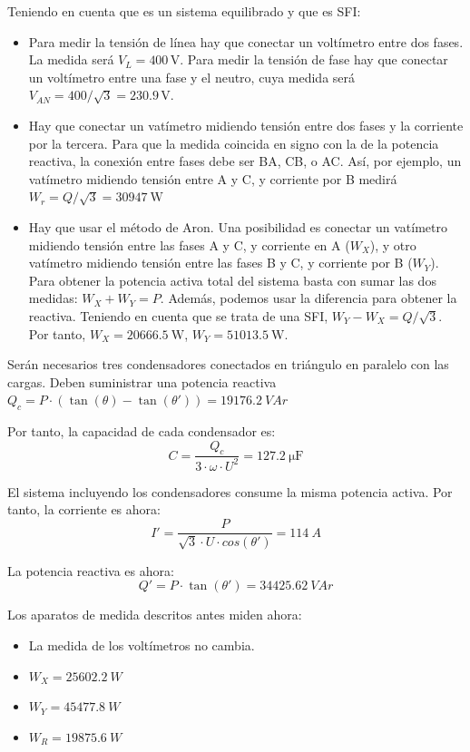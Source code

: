 Teniendo en cuenta que es un sistema equilibrado y que es SFI:
\begin{itemize}

\item Para medir la tensión de línea hay que conectar un voltímetro
  entre dos fases. La medida será $V_{L} = 400\,\mathrm{V}$. Para medir
  la tensión de fase hay que conectar un voltímetro entre una fase y
  el neutro, cuya medida será $V_{AN} = 400 / \sqrt{3} = 230.9\,\mathrm{V}$.

\item Hay que conectar un vatímetro midiendo tensión entre dos fases y
  la corriente por la tercera. Para que la medida coincida en signo
  con la de la potencia reactiva, la conexión entre fases debe ser BA,
  CB, o AC. Así, por ejemplo, un vatímetro midiendo tensión entre A y
  C, y corriente por B medirá $W_r = Q / \sqrt{3} = \qty{30947}{\watt}$

\item Hay que usar el método de Aron. Una posibilidad es conectar un
  vatímetro midiendo tensión entre las fases A y C, y corriente en A
  ($W_X$), y otro vatímetro midiendo tensión entre las fases B y C, y
  corriente por B ($W_Y$). Para obtener la potencia activa total del
  sistema basta con sumar las dos medidas: $W_{X} + W_{Y} =
  P$. Además, podemos usar la diferencia para obtener la
  reactiva. Teniendo en cuenta que se trata de una SFI,
  $W_Y - W_X = Q/\sqrt{3}$. Por tanto, $W_X = \SI{20666.5}{\watt}$,
  $W_Y = \SI{51013.5}{\watt}$.

\end{itemize}


Serán necesarios tres condensadores conectados en triángulo en
paralelo con las cargas. Deben suministrar una potencia reactiva
$Q_c = P \cdot (\tan(\theta) - \tan(\theta')) = \SI{19176.2}{VAr}$

\vspace{2mm}
Por tanto, la capacidad de cada condensador es:
\[
  C = \frac{Q_c}{3 \cdot \omega \cdot U^2} = \SI{127.2}{\micro\farad}
\]

El sistema incluyendo los condensadores consume la misma potencia
activa. Por tanto, la corriente es ahora:
\[I' = \frac{P}{\sqrt{3} \cdot U \cdot cos(\theta')} = \SI{114}{A}\]

La potencia reactiva es ahora:
\[
  Q' = P \cdot \tan(\theta') = \SI{34425.62}{VAr}
\]

Los aparatos de medida descritos antes miden ahora:
\begin{itemize}
\item La medida de los voltímetros no cambia.
\item $W_X = \SI{25602.2}{W}$
\item $W_Y = \SI{45477.8}{W}$
\item $W_R = \SI{19875.6}{W}$
\end{itemize}


